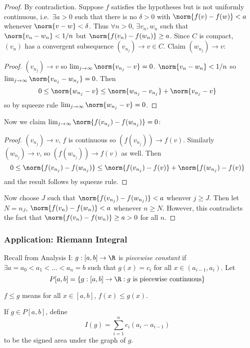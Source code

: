 \documentclass[a4paper]{article}
\theoremstyle{definition}
\begin{document}
\begin{proof}
  By contradiction. Suppose \(f\) satisfies the hypotheses but is not uniformly continuous, i.e.\ \(\exists a > 0\) such that there is no \(\delta > 0\) with \(\norm{f(v) - f (w)} < a\) whenever \(\norm{v - w} < \delta\). Thus \(\forall n > 0\), \(\exists v_n, w_n\) such that \(\norm{v_n - w_n} < 1/n\) but \(\norm{f(v_n) - f(w_n)} \geq a\). Since \(C\) is compact, \((v_n)\) has a convergent subsequence \((v_{n_j}) \to v \in C\). Claim \((w_{n_j}) \to v\):
  \begin{proof}
    \((v_{n_j}) \to  v\) so \(\lim_{j\to \infty}\norm{v_{n_j} - v} = 0\). \(\norm{v_n - w_n} < 1/n\) so \(\lim_{j\to \infty}\norm{v_{n_j} - w_{n_j}} = 0\). Then
    \[
      0 \leq \norm{w_{n_j} - v} \leq \norm{w_{n_j} - v_{n_j}} + \norm{v_{n_j} - v}
  \]
  so by squeeze rule \(\lim_{j\to \infty} \norm{w_{n_j} - v} = 0\).
  \end{proof}
  Now we claim \(\lim_{j\to \infty} \norm{f(v_{n_j}) - f(w_{n_j})} = 0\):
    \begin{proof}
      \((v_{n_j}) \to v\), \(f\) is continuous so \((f(v_{n_j})) \to f(v)\).
      Similarly \((w_{n_j}) \to v\), so \((f(w_{n_j})) \to f(v)\) as well. Then
      \[
        0 \leq \norm{f(v_{n_j}) - f(w_{n_j})} \leq \norm{f(v_{n_j}) - f(v)} + \norm{f(w_{n_j}) - f(v)}
      \]
      and the result follows by squeeze rule.
    \end{proof}
    Now choose \(J\) such that \(\norm{f(v_{n_j}) - f(w_{n_j})} < a\) whenver \(j \geq J\). Then let \(N = n_J\), \(\norm{f(v_n) - f(w_n)} < a\) whenever \(n \geq N\). However, this contradicts the fact that \(\norm{f(v_n) - f(w_n)} \geq a > 0\) for all \(n\).
\end{proof}

\subsubsection{Application: Riemann Integral}

Recall from Analysis I: \(g: [a, b] \to \R \) is \emph{piecewise constant} if \(\exists a = a_0 < a_1 < \dots < a_n = b\) such that \(g(x) = c_i\) for all \(x\in (a_{i-1}, a_i)\). Let
\[
  P[a, b] = \{g: [a, b] \to \R: g \text{ is piecewise continuous} \}
\]

\begin{notation}
  \(f \leq g\) means for all \(x \in [a, b]\), \(f(x) \leq g(x)\).
\end{notation}

If \(g \in P[a, b]\), define
\[
  I(g) = \sum_{i=1}^{n}c_i(a_i - a_{i-1})
\]
to be the signed area under the graph of \(g\).
\end{document}

